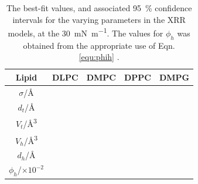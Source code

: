 \documentclass[amsmath,amssymb,twocolumn,superscriptaddress]{revtex4-1}
\begin{document}
\begin{table}
	\caption{\label{tab:liptab} The best-fit values, and associated \SI{95}{\percent} confidence intervals for the varying parameters in the XRR models, at the \SI{30}{\milli\newton\per\meter}. The values for $\phi_h$ was obtained from the appropriate use of Eqn. \ref{equ:phih} \cite{SI2019}.}
  \begin{ruledtabular}
	\begin{tabular*}{\textwidth}{ccccc}
    Lipid & DLPC & DMPC & DPPC & DMPG \\
    \hline
    $\sigma$/\si{\angstrom} &  &  &  &  \\
    $d_t$/\si{\angstrom} &  &  &  &  \\
    \hline
    $V_t$/\si{\cubic\angstrom} &  &  &  &  \\
    $V_h$/\si{\cubic\angstrom} &  &  &  &  \\
    $d_h$/\si{\angstrom} &  &  &  &  \\
    \hline
    $\phi_h$/$\times10^{-2}$ &  &  &  &  \\
	\end{tabular*}
  \end{ruledtabular}
\end{table}
%
\end{document}
